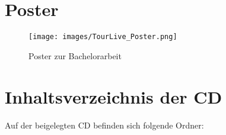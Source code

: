 \section{Poster}
\begin{figure}[H]
	\centering
	\texttt{[image: images/TourLive\_Poster.png]}
	\caption{Poster zur Bachelorarbeit}
\end{figure}

\section{Inhaltsverzeichnis der CD}
Auf der beigelegten CD befinden sich folgende Ordner:
%


